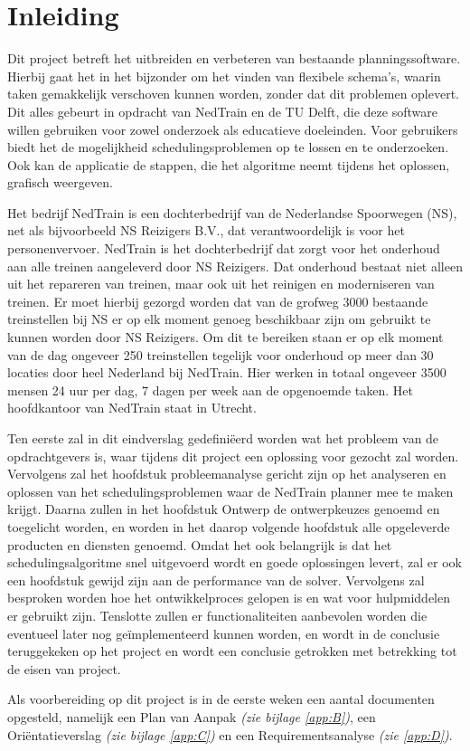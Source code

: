 \section{Inleiding}
Dit project betreft het uitbreiden en verbeteren van bestaande planningssoftware. Hierbij gaat het in het bijzonder om het vinden van flexibele schema's, waarin taken gemakkelijk verschoven kunnen worden, zonder dat dit problemen oplevert. Dit alles gebeurt in opdracht van NedTrain en de TU Delft, die deze software willen gebruiken voor zowel onderzoek als educatieve doeleinden. Voor gebruikers biedt het de mogelijkheid schedulingsproblemen op te lossen en te onderzoeken. Ook kan de applicatie de stappen, die het algoritme neemt tijdens het oplossen, grafisch weergeven. 

Het bedrijf NedTrain is een dochterbedrijf van de Nederlandse Spoorwegen (NS), net als bijvoorbeeld NS Reizigers B.V., dat verantwoordelijk is voor het personenvervoer. NedTrain is het dochterbedrijf dat zorgt voor het onderhoud aan alle treinen aangeleverd door NS Reizigers. Dat onderhoud bestaat niet alleen uit het repareren van treinen, maar ook uit het reinigen en moderniseren van treinen. Er moet hierbij gezorgd worden dat van de grofweg 3000 bestaande treinstellen bij NS er op elk moment genoeg beschikbaar zijn om gebruikt te kunnen worden door NS Reizigers. Om dit te bereiken staan er op elk moment van de dag ongeveer 250 treinstellen tegelijk voor onderhoud op meer dan 30 locaties door heel Nederland bij NedTrain. Hier werken in totaal ongeveer 3500 mensen 24 uur per dag, 7 dagen per week aan de opgenoemde taken. Het hoofdkantoor van NedTrain staat in Utrecht.

Ten eerste zal in dit eindverslag gedefini\"eerd worden wat het probleem van de opdrachtgevers is, waar tijdens dit project een oplossing voor gezocht zal worden. Vervolgens zal het hoofdstuk probleemanalyse gericht zijn op het analyseren en oplossen van het schedulingsproblemen waar de NedTrain planner mee te maken krijgt. Daarna zullen in het hoofdstuk Ontwerp de ontwerpkeuzes genoemd en toegelicht worden, en worden in het daarop volgende hoofdstuk alle opgeleverde producten en diensten genoemd. Omdat het ook belangrijk is dat het schedulingsalgoritme snel uitgevoerd wordt en goede oplossingen levert, zal er ook een hoofdstuk gewijd zijn aan de performance van de solver. Vervolgens zal besproken worden hoe het ontwikkelproces gelopen is en wat voor hulpmiddelen er gebruikt zijn. Tenslotte zullen er functionaliteiten aanbevolen worden die eventueel later nog ge\"implementeerd kunnen worden, en wordt in de conclusie teruggekeken op het project en wordt een conclusie getrokken met betrekking tot de eisen van project.

Als voorbereiding op dit project is in de eerste weken een aantal documenten opgesteld, namelijk een Plan van Aanpak \emph{(zie bijlage \ref{app:B})}, een Ori\"entatieverslag \emph{(zie bijlage \ref{app:C})} en een Requirementsanalyse \emph{(zie \ref{app:D})}.